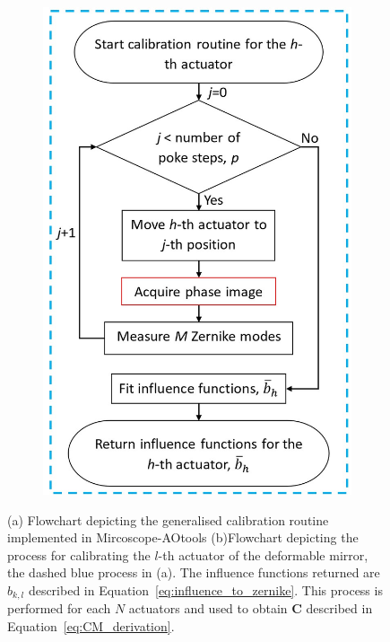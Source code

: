 \begin{figure}[h]
\begin{subfigure}{0.45\textwidth}
		\includegraphics[width=1\linewidth, scale=0.5]{images/Ith_actuator_calibration_workflow_blue_border.jpg}
		\caption{}
		\label{fig:Ith_actuator_calibration_workflow_blue_border}
	\end{subfigure}
	\caption{(a) Flowchart depicting the generalised calibration routine implemented in Mircoscope-AOtools (b)Flowchart depicting the process for calibrating the $l$-th actuator of the deformable mirror, the dashed blue process in (a). The influence functions returned are $b_{k,l}$ described in Equation~\ref{eq:influence_to_zernike}. This process is performed for each $N$ actuators and used to obtain $\boldsymbol{C}$ described in Equation~\ref{eq:CM_derivation}.}
	\label{fig:calibration_workflow}
\end{figure}

